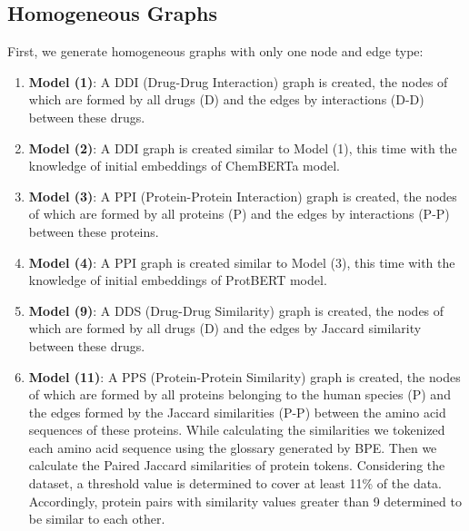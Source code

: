 \subsection{Homogeneous Graphs}
First, we generate homogeneous graphs with only one node and edge type:
\begin{enumerate}
    \item \textbf{Model (1)}: A DDI (Drug-Drug Interaction) graph is created, the nodes of which are formed by all drugs (D) and the edges by interactions (D-D) between these drugs.   
    \item \textbf{Model (2)}: A DDI graph is created similar to Model (1), this time with the knowledge of initial embeddings of ChemBERTa model.
    \item \textbf{Model (3)}: A PPI (Protein-Protein Interaction) graph is created, the nodes of which are formed by all proteins (P) and the edges by interactions (P-P) between these proteins.   
    \item \textbf{Model (4)}: A PPI graph is created similar to Model (3), this time with the knowledge of initial embeddings of ProtBERT model.
    \item \textbf{Model (9)}: A DDS (Drug-Drug Similarity) graph is created, the nodes of which are formed by all drugs (D) and the edges by Jaccard similarity between these drugs.   
    \item \textbf{Model (11)}: A PPS (Protein-Protein Similarity) graph is created, the nodes of which are formed by all proteins belonging to the human species (P) and the edges formed by the Jaccard similarities (P-P) between the amino acid sequences of these proteins. While calculating the similarities we tokenized each amino acid sequence using the glossary generated by BPE. Then we calculate the Paired Jaccard similarities of protein tokens. Considering the dataset, a threshold value is determined to cover at least 11\% of the data. Accordingly, protein pairs with similarity values greater than 9 determined to be similar to each other.
\end{enumerate}












